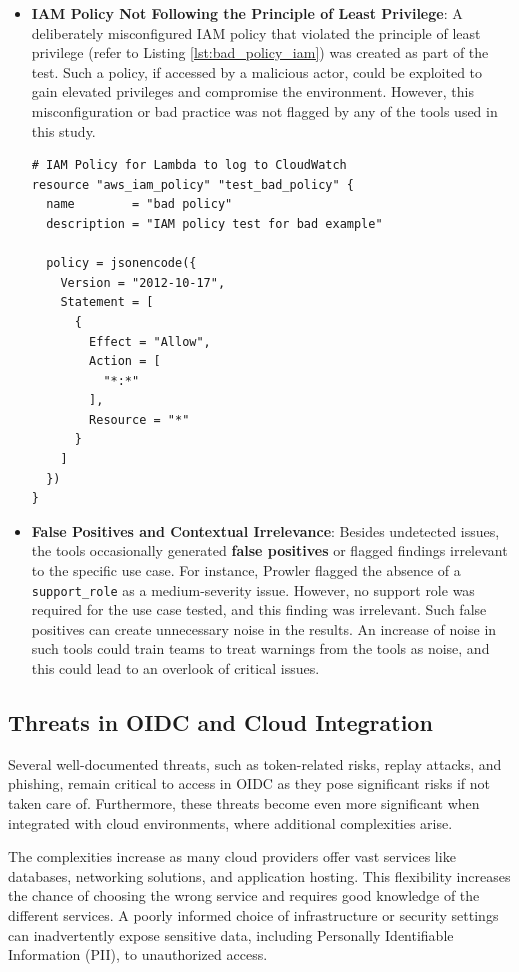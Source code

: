 \begin{itemize}
    \item \textbf{IAM Policy Not Following the Principle of Least Privilege}: 
    A deliberately misconfigured IAM policy that violated the principle of least privilege (refer to Listing \ref{lst:bad_policy_iam}) was created as part of the test. Such a policy, if accessed by a malicious actor, could be exploited to gain elevated privileges and compromise the environment. However, this misconfiguration or bad practice was not flagged by any of the tools used in this study.

    \begin{lstlisting}[caption={Added a Bad IAM Policy that allows all actions}, label={lst:bad_policy_iam}]
# IAM Policy for Lambda to log to CloudWatch
resource "aws_iam_policy" "test_bad_policy" {
  name        = "bad policy"
  description = "IAM policy test for bad example"

  policy = jsonencode({
    Version = "2012-10-17",
    Statement = [
      {
        Effect = "Allow",
        Action = [
          "*:*"
        ],
        Resource = "*"
      }
    ]
  })
}
\end{lstlisting} 

\item \textbf{False Positives and Contextual Irrelevance}: Besides undetected issues, the tools occasionally generated \textbf{false positives} or flagged findings irrelevant to the specific use case. For instance, Prowler flagged the absence of a \texttt{support\_role} as a medium-severity issue. However, no support role was required for the use case tested, and this finding was irrelevant. Such false positives can create unnecessary noise in the results. An increase of noise in such tools could train teams to treat warnings from the tools as noise, and this could lead to an overlook of critical issues.
\end{itemize}

\subsection{Threats in OIDC and Cloud Integration}
Several well-documented threats, such as token-related risks, replay attacks, and phishing, remain critical to access in OIDC as they pose significant risks if not taken care of. Furthermore, these threats become even more significant when integrated with cloud environments, where additional complexities arise.

The complexities increase as many cloud providers offer vast services like databases, networking solutions, and application hosting. This flexibility increases the chance of choosing the wrong service and requires good knowledge of the different services. A poorly informed choice of infrastructure or security settings can inadvertently expose sensitive data, including Personally Identifiable Information (PII), to unauthorized access.

